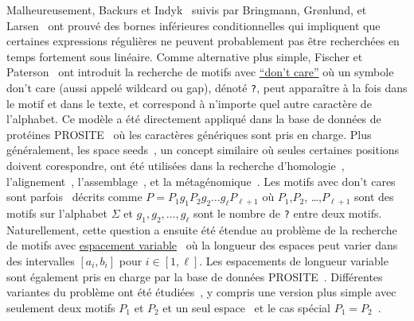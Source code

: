 Malheureusement, Backurs et Indyk~\cite{DBLP:conf/focs/BackursI16} suivis par Bringmann, Gr{\o}nlund, et Larsen~\cite{8104068} ont prouvé des bornes inférieures conditionnelles qui impliquent que certaines expressions régulières ne peuvent probablement pas être recherchées en temps fortement sous linéaire.
Comme alternative plus simple, Fischer et Paterson~\cite{FischerPaterson} ont introduit la recherche de motifs avec \underline{``don't care''} où un symbole don't care (aussi appelé wildcard ou gap), dénoté \texttt{?}, peut apparaître à la fois dans le motif et dans le texte, et correspond à n'importe quel autre caractère de l'alphabet.
Ce modèle a été directement appliqué dans la base de données de protéines PROSITE~\cite{hulo2006prosite} où les caractères génériques sont pris en charge. Plus généralement, les space seeds~\cite{li2004patternhunter}, un concept similaire où seules certaines positions doivent corespondre, ont été utilisées dans la recherche d'homologie~\cite{ma2002patternhunter}, l'alignement~\cite{david2011shrimp2}, l'assemblage~\cite{birol2015spaced}, et la métagénomique~\cite{bvrinda2015spaced}.
Les motifs avec don't cares sont parfois~\cite{lewenstein2011indexing} décrits comme $P= P_1g_1P_2g_2 \dots g_\ell P_{\ell+1}$ où $P_1$,$P_2$, \dots,$P_{\ell+1}$ sont des motifs sur l'alphabet $\Sigma$ et $g_1,g_2,\dots,g_{\ell}$ sont le nombre de \texttt{?} entre deux motifs. 
Naturellement, cette question a ensuite été étendue au problème de la recherche de motifs avec \underline{espacement variable}~\cite{bille2012string,bille2014string} où la longueur des espaces peut varier dans des intervalles $[a_i,b_i]$ pour $i\in[1,\ell]$.
Les espacements de longueur variable sont également pris en charge par la base de données PROSITE~\cite{hulo2006prosite}.
Différentes variantes du problème ont été étudiées~\cite{kopelowitz2016color,cohen2009range,brodal1999finding}, y compris une version plus simple avec seulement deux motifs $P_1$ et $P_2$ et un seul espace~\cite{peterlongo2006gapped,iliopoulos2009indexing} et le cas spécial $P_1=P_2$~\cite{muthukrishnan2002efficient,keller2007range}.

